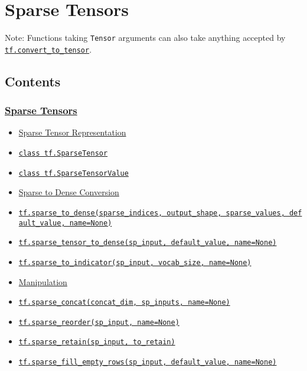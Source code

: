 

\section{Sparse Tensors }\label{sparse-tensors}

Note: Functions taking \texttt{Tensor} arguments can also take anything
accepted by
\href{../../api_docs/python/framework.md\#convert_to_tensor}{\texttt{tf.convert\_to\_tensor}}.

\subsection{Contents}\label{contents}

\subsubsection{\texorpdfstring{\protect\hyperlink{AUTOGENERATED-sparse-tensors}{Sparse
Tensors}}{Sparse Tensors}}\label{sparse-tensors-1}

\begin{itemize}
\tightlist
\item
  \protect\hyperlink{AUTOGENERATED-sparse-tensor-representation}{Sparse
  Tensor Representation}
\item
  \protect\hyperlink{SparseTensor}{\texttt{class\ tf.SparseTensor}}
\item
  \protect\hyperlink{SparseTensorValue}{\texttt{class\ tf.SparseTensorValue}}
\item
  \protect\hyperlink{AUTOGENERATED-sparse-to-dense-conversion}{Sparse to
  Dense Conversion}
\item
  \protect\hyperlink{sparseux5ftoux5fdense}{\texttt{tf.sparse\_to\_dense(sparse\_indices,\ output\_shape,\ sparse\_values,\ default\_value,\ name=None)}}
\item
  \protect\hyperlink{sparseux5ftensorux5ftoux5fdense}{\texttt{tf.sparse\_tensor\_to\_dense(sp\_input,\ default\_value,\ name=None)}}
\item
  \protect\hyperlink{sparseux5ftoux5findicator}{\texttt{tf.sparse\_to\_indicator(sp\_input,\ vocab\_size,\ name=None)}}
\item
  \protect\hyperlink{AUTOGENERATED-manipulation}{Manipulation}
\item
  \protect\hyperlink{sparseux5fconcat}{\texttt{tf.sparse\_concat(concat\_dim,\ sp\_inputs,\ name=None)}}
\item
  \protect\hyperlink{sparseux5freorder}{\texttt{tf.sparse\_reorder(sp\_input,\ name=None)}}
\item
  \protect\hyperlink{sparseux5fretain}{\texttt{tf.sparse\_retain(sp\_input,\ to\_retain)}}
\item
  \protect\hyperlink{sparseux5ffillux5femptyux5frows}{\texttt{tf.sparse\_fill\_empty\_rows(sp\_input,\ default\_value,\ name=None)}}
\end{itemize}

